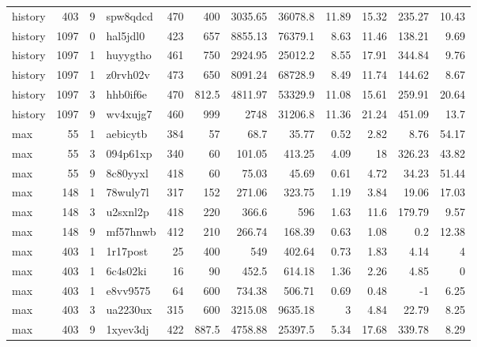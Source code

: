 \documentclass[9pt,a4paper,twocolumn,lineno]{article}
\begin{document}
\begin{table}
\begin{tabular}{lrrlrrrrrrrr}
 history  &  403 &   9 & spw8qdcd & 470 &    400   &  3035.65 & 36078.8  & 11.89 &  15.32 & 235.27 &        10.43 \\
 history  & 1097 &   0 & hal5jdl0 & 423 &    657   &  8855.13 & 76379.1  &  8.63 &  11.46 & 138.21 &         9.69 \\
 history  & 1097 &   1 & huyygtho & 461 &    750   &  2924.95 & 25012.2  &  8.55 &  17.91 & 344.84 &         9.76 \\
 history  & 1097 &   1 & z0rvh02v & 473 &    650   &  8091.24 & 68728.9  &  8.49 &  11.74 & 144.62 &         8.67 \\
 history  & 1097 &   3 & hhb0if6e & 470 &    812.5 &  4811.97 & 53329.9  & 11.08 &  15.61 & 259.91 &        20.64 \\
 history  & 1097 &   9 & wv4xujg7 & 460 &    999   &  2748    & 31206.8  & 11.36 &  21.24 & 451.09 &        13.7  \\
 max      &   55 &   1 & aebicytb & 384 &     57   &    68.7  &    35.77 &  0.52 &   2.82 &   8.76 &        54.17 \\
 max      &   55 &   3 & 094p61xp & 340 &     60   &   101.05 &   413.25 &  4.09 &  18    & 326.23 &        43.82 \\
 max      &   55 &   9 & 8c80yyxl & 418 &     60   &    75.03 &    45.69 &  0.61 &   4.72 &  34.23 &        51.44 \\
 max      &  148 &   1 & 78wuly7l & 317 &    152   &   271.06 &   323.75 &  1.19 &   3.84 &  19.06 &        17.03 \\
 max      &  148 &   3 & u2sxnl2p & 418 &    220   &   366.6  &   596    &  1.63 &  11.6  & 179.79 &         9.57 \\
 max      &  148 &   9 & mf57hnwb & 412 &    210   &   266.74 &   168.39 &  0.63 &   1.08 &   0.2  &        12.38 \\
 max      &  403 &   1 & 1r17post &  25 &    400   &   549    &   402.64 &  0.73 &   1.83 &   4.14 &         4    \\
 max      &  403 &   1 & 6c4s02ki &  16 &     90   &   452.5  &   614.18 &  1.36 &   2.26 &   4.85 &         0    \\
 max      &  403 &   1 & e8vv9575 &  64 &    600   &   734.38 &   506.71 &  0.69 &   0.48 &  -1    &         6.25 \\
 max      &  403 &   3 & ua2230ux & 315 &    600   &  3215.08 &  9635.18 &  3    &   4.84 &  22.79 &         8.25 \\
 max      &  403 &   9 & 1xyev3dj & 422 &    887.5 &  4758.88 & 25397.5  &  5.34 &  17.68 & 339.78 &         8.29 \\

\end{tabular}
\end{table}
\end{document}
